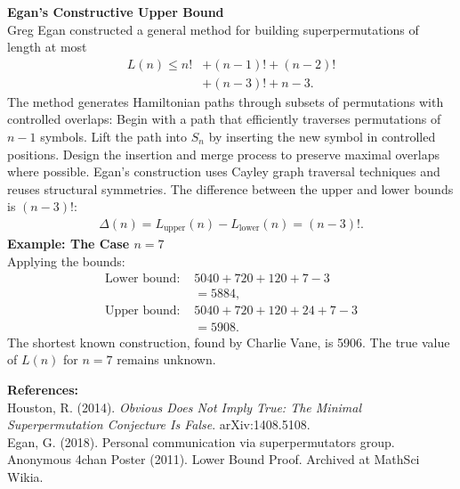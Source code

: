 \begin{technical}
\noindent\textbf{Egan's Constructive Upper Bound}\\
Greg Egan constructed a general method for building superpermutations of length at most
\begin{align*}
L(n) \leq n! &+ (n-1)! + (n-2)! \\
&+ (n-3)! + n - 3.
\end{align*}
The method generates Hamiltonian paths through subsets of permutations with controlled overlaps: Begin with a path that efficiently traverses permutations of $n-1$ symbols. Lift the path into $S_n$ by inserting the new symbol in controlled positions. Design the insertion and merge process to preserve maximal overlaps where possible. Egan's construction uses Cayley graph traversal techniques and reuses structural symmetries. The difference between the upper and lower bounds is $(n-3)!$:
\begin{align*}
\Delta(n) = L_{\text{upper}}(n) - L_{\text{lower}}(n) = (n-3)!.
\end{align*}
\noindent\textbf{Example: The Case $n = 7$}\\
Applying the bounds:
\begin{align}
\text{Lower bound: } & 5040 + 720 + 120 + 7 - 3\\
 &= 5884, \\
\text{Upper bound: } & 5040 + 720 + 120 + 24 + 7 - 3\\
 &= 5908.
\end{align}
The shortest known construction, found by Charlie Vane, is 5906. The true value of $L(n)$ for $n = 7$ remains unknown.

\noindent\textbf{References:}\\
Houston, R. (2014). \textit{Obvious Does Not Imply True: The Minimal Superpermutation Conjecture Is False}. arXiv:1408.5108.\\
Egan, G. (2018). Personal communication via superpermutators group.\\
Anonymous 4chan Poster (2011). Lower Bound Proof. Archived at MathSci Wikia.
\end{technical}
